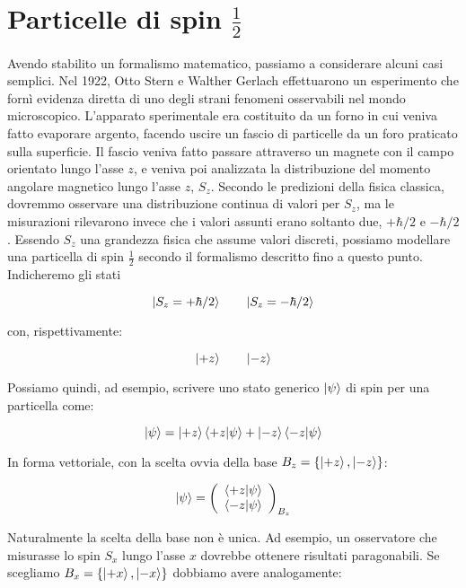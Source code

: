 \section{Particelle di spin $\frac{1}{2}$}

Avendo stabilito un formalismo matematico, passiamo a considerare alcuni casi semplici.
Nel 1922, Otto Stern e Walther Gerlach effettuarono un esperimento che fornì evidenza diretta di uno degli strani fenomeni osservabili nel mondo microscopico.
L'apparato sperimentale era costituito da un forno in cui veniva fatto evaporare argento, facendo uscire un fascio di particelle da un foro praticato sulla superficie.
Il fascio veniva fatto passare attraverso un magnete con il campo orientato lungo l'asse $z$, e veniva poi analizzata la distribuzione del momento angolare magnetico lungo l'asse $z$, $S_z$.
Secondo le predizioni della fisica classica, dovremmo osservare una distribuzione continua di valori per $S_z$, ma le misurazioni
rilevarono invece che i valori assunti erano soltanto due, $+ \hbar / 2$ e $- \hbar / 2$.
Essendo $S_z$ una grandezza fisica che assume valori discreti, possiamo modellare una particella di spin $\frac{1}{2}$ secondo il formalismo descritto fino a questo punto. Indicheremo gli stati

	\[
		\ket{S_z = + \hbar / 2} \quad \quad \ket{S_z = - \hbar / 2}
	\]

con, rispettivamente:

	\[
		\ket{+z} \quad \quad \ket{-z}
	\]

Possiamo quindi, ad esempio, scrivere uno stato generico $\ket{\psi}$ di spin per una particella come:

	\begin{equation}
		\ket{\psi} =  \ket{+z} \braket{+z}{\psi} + \ket{-z} \braket{-z}{\psi}
	\end{equation}

In forma vettoriale, con la scelta ovvia della base $B_z = \{ \ket{+z}, \ket{-z} \}$:

	\begin{equation}
		\ket{\psi} =
			\left ( \begin{array}{c}
				\braket{+z}{\psi} \\
				\braket{-z}{\psi}
			\end{array} \right )_{B_z}
	\end{equation}

Naturalmente la scelta della base non \`e unica. Ad esempio, un osservatore che misurasse lo spin $S_x$ lungo l'asse $x$ dovrebbe ottenere risultati paragonabili. Se scegliamo $B_x = \{ \ket{+x}, \ket{-x} \}$ dobbiamo avere analogamente:

